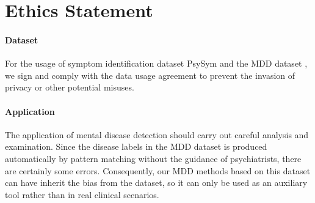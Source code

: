 \section*{Ethics Statement}

\paragraph{Dataset} 

For the usage of symptom identification dataset PsySym and the MDD dataset \cite{Zhang2022SymptomIF}, we sign and comply with the data usage agreement to prevent the invasion of privacy or other potential misuses. 

\paragraph{Application} The application of mental disease detection should carry out careful analysis and examination. Since the disease labels in the MDD dataset is produced automatically by pattern matching without the guidance of psychiatrists, there are certainly some errors. Consequently, our MDD methods based on this dataset can have inherit the bias from the dataset, so it can only be used as an auxiliary tool rather than in real clinical scenarios.

